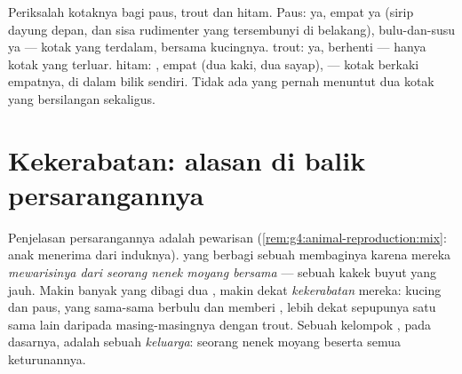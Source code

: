 \begin{example}\label{ex:g6:classification-kinship:placing}
Periksalah kotaknya bagi paus,  trout dan  hitam. Paus:
 ya, empat  ya (sirip dayung depan, dan
sisa rudimenter yang tersembunyi di belakang), bulu-dan-susu ya ---
kotak yang terdalam, bersama kucingnya.  trout: 
ya, berhenti --- hanya kotak yang terluar.  hitam: , empat  (dua kaki, dua sayap),  ---
kotak berkaki empatnya, di dalam bilik  sendiri. Tidak
ada  yang pernah menuntut dua kotak yang bersilangan sekaligus.
\end{example}

\section{Kekerabatan: alasan di balik persarangannya}

\begin{proposition}\label{prop:g6:classification-kinship:kinship}
Penjelasan persarangannya adalah pewarisan
(\cref{rem:g4:animal-reproduction:mix}: anak menerima dari induknya).
 yang berbagi sebuah  membaginya karena mereka
\emph{mewarisinya dari seorang nenek moyang bersama} --- sebuah
 kakek buyut yang jauh. Makin banyak  yang dibagi dua
, makin dekat \emph{kekerabatan} mereka:
kucing dan paus, yang sama-sama berbulu dan memberi , lebih dekat
sepupunya satu sama lain daripada masing-masingnya dengan  trout.
Sebuah kelompok , pada dasarnya, adalah sebuah
\emph{keluarga}: seorang nenek moyang beserta semua keturunannya.
\end{proposition}
\admitted


